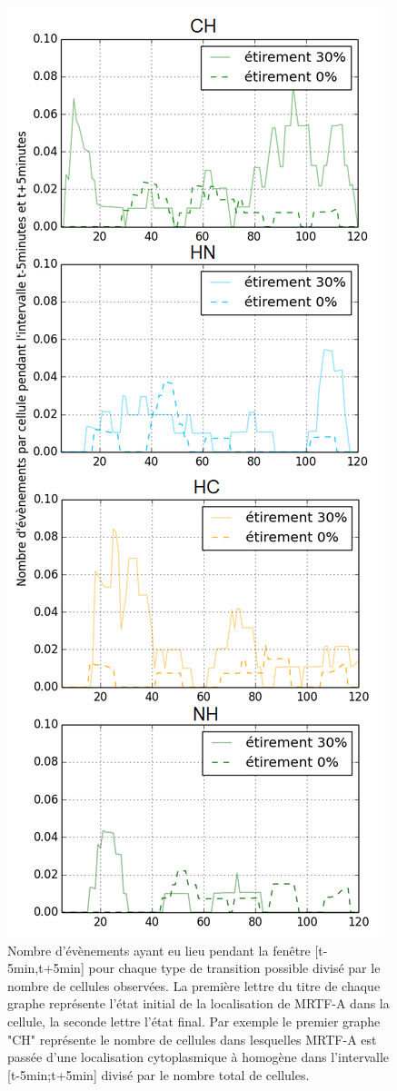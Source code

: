 \begin{figure}
\includegraphics[scale=0.4]{Figures/Etirement30_vs_0_translocations.png}
\caption{\label{Et30_transloc} Nombre d'évènements ayant eu lieu pendant la fenêtre [t-5min,t+5min] pour chaque type de transition possible divisé par le nombre de cellules observées. La première lettre du titre de chaque graphe représente l'état initial de la localisation de MRTF-A dans la cellule, la seconde lettre l'état final. Par exemple le premier graphe "CH" représente le nombre de cellules dans lesquelles MRTF-A est passée d'une localisation cytoplasmique à homogène dans l'intervalle [t-5min;t+5min] divisé par le nombre total de cellules. }
\end{figure}


